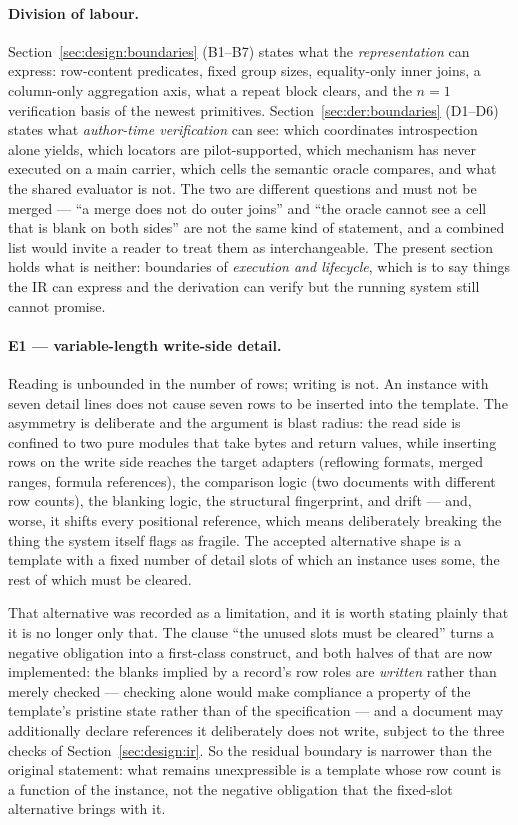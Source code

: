 \paragraph{Division of labour.}
Section~\ref{sec:design:boundaries} (B1--B7) states what the \emph{representation} can express:
row-content predicates, fixed group sizes, equality-only inner joins, a column-only aggregation
axis, what a repeat block clears, and the $n=1$ verification basis of the newest primitives.
Section~\ref{sec:der:boundaries} (D1--D6) states what \emph{author-time verification} can see:
which coordinates introspection alone yields, which locators are pilot-supported, which
mechanism has never executed on a main carrier, which cells the semantic oracle compares, and
what the shared evaluator is not. The two are different questions and must not be merged --- ``a
merge does not do outer joins'' and ``the oracle cannot see a cell that is blank on both sides''
are not the same kind of statement, and a combined list would invite a reader to treat them as
interchangeable. The present section holds what is neither: boundaries of \emph{execution and
lifecycle}, which is to say things the IR can express and the derivation can verify but the
running system still cannot promise.

\paragraph{E1 --- variable-length write-side detail.}
Reading is unbounded in the number of rows; writing is not. An instance with seven detail lines
does not cause seven rows to be inserted into the template. The asymmetry is deliberate and the
argument is blast radius: the read side is confined to two pure modules that take bytes and
return values, while inserting rows on the write side reaches the target adapters (reflowing
formats, merged ranges, formula references), the comparison logic (two documents with different
row counts), the blanking logic, the structural fingerprint, and drift --- and, worse, it shifts
every positional reference, which means deliberately breaking the thing the system itself flags
as fragile. The accepted alternative shape is a template with a fixed number of detail slots of
which an instance uses some, the rest of which must be cleared.

That alternative was recorded as a limitation, and it is worth stating plainly that it is no
longer only that. The clause ``the unused slots must be cleared'' turns a negative obligation
into a first-class construct, and both halves of that are now implemented: the blanks implied by
a record's row roles are \emph{written} rather than merely checked --- checking alone would make
compliance a property of the template's pristine state rather than of the specification --- and a
document may additionally declare references it deliberately does not write, subject to the three
checks of Section~\ref{sec:design:ir}. So the residual boundary is narrower than the original
statement: what remains unexpressible is a template whose row count is a function of the instance,
not the negative obligation that the fixed-slot alternative brings with it.

